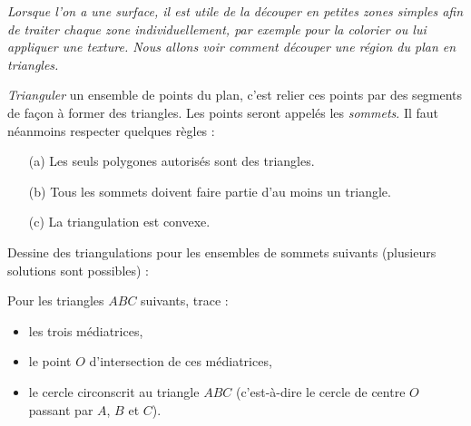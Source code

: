 \documentclass[class=report,crop=false, 12pt]{standalone}
\begin{document}


\emph{Lorsque l'on a une surface, il est utile de la découper en petites zones simples afin de traiter chaque zone individuellement, par exemple pour la colorier ou lui appliquer une texture. Nous allons voir comment découper une région du plan en triangles.}

\bigskip
\bigskip


\begin{activite}[Triangulation]

\emph{Trianguler} un ensemble de points du plan, c'est relier ces points par des segments de façon à former des triangles. Les points seront appelés les \emph{sommets}.
Il faut néanmoins respecter quelques règles : 
\begin{itemize}
  \item[(a)] Les seuls polygones autorisés sont des triangles.
  \item[(b)] Tous les sommets doivent faire partie d'au moins un triangle.
  \item[(c)] La triangulation est convexe.
\end{itemize}  
   
  
  \medskip
  


Dessine des triangulations pour les ensembles de sommets suivants (plusieurs solutions sont possibles) :
   
\end{activite}

\begin{activite}[Un triangle]

Pour les triangles $ABC$  suivants, trace :
\begin{itemize}
  \item les trois médiatrices,
  \item le point $O$ d'intersection de ces médiatrices,
  \item le cercle circonscrit au triangle $ABC$ (c'est-à-dire le cercle de centre $O$ passant par $A$, $B$ et $C$).
\end{itemize}

  
  

\end{activite}
\end{document}
